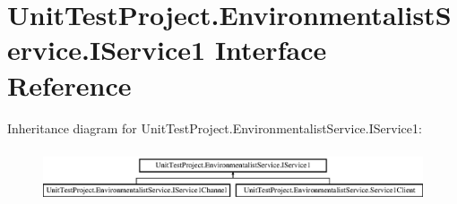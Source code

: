 \hypertarget{interface_unit_test_project_1_1_environmentalist_service_1_1_i_service1}{}\section{Unit\+Test\+Project.\+Environmentalist\+Service.\+I\+Service1 Interface Reference}
\label{interface_unit_test_project_1_1_environmentalist_service_1_1_i_service1}
Inheritance diagram for Unit\+Test\+Project.\+Environmentalist\+Service.\+I\+Service1\+:\begin{figure}[H]
\begin{center}
\leavevmode
\includegraphics[height=1.604584cm]{interface_unit_test_project_1_1_environmentalist_service_1_1_i_service1}
\end{center}
\end{figure}
